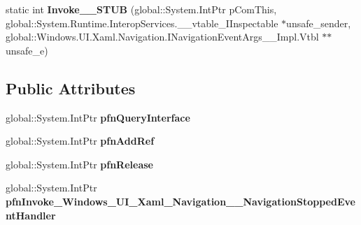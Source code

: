 \begin{DoxyCompactItemize}
\item 
\mbox{\label{struct_windows_1_1_u_i_1_1_xaml_1_1_navigation_1_1_navigation_stopped_event_handler_____impl_1_1_vtbl_aae8bd7c57fa7d06fce78441e6b852c80}} 
static int {\bfseries Invoke\+\_\+\+\_\+\+S\+T\+UB} (global\+::\+System.\+Int\+Ptr p\+Com\+This, global\+::\+System.\+Runtime.\+Interop\+Services.\+\_\+\+\_\+vtable\+\_\+\+I\+Inspectable $\ast$unsafe\+\_\+sender, global\+::\+Windows.\+U\+I.\+Xaml.\+Navigation.\+I\+Navigation\+Event\+Args\+\_\+\+\_\+\+Impl.\+Vtbl $\ast$$\ast$unsafe\+\_\+e)
\end{DoxyCompactItemize}
\subsection*{Public Attributes}
\begin{DoxyCompactItemize}
\item 
\mbox{\label{struct_windows_1_1_u_i_1_1_xaml_1_1_navigation_1_1_navigation_stopped_event_handler_____impl_1_1_vtbl_aef2de3a42e8325c6ee9c0f8f1fb0f4a3}} 
global\+::\+System.\+Int\+Ptr {\bfseries pfn\+Query\+Interface}
\item 
\mbox{\label{struct_windows_1_1_u_i_1_1_xaml_1_1_navigation_1_1_navigation_stopped_event_handler_____impl_1_1_vtbl_a6385d7668abfeabd1cba44953afd55e6}} 
global\+::\+System.\+Int\+Ptr {\bfseries pfn\+Add\+Ref}
\item 
\mbox{\label{struct_windows_1_1_u_i_1_1_xaml_1_1_navigation_1_1_navigation_stopped_event_handler_____impl_1_1_vtbl_aea7170ae54b10655ce3f5c5dc709b416}} 
global\+::\+System.\+Int\+Ptr {\bfseries pfn\+Release}
\item 
\mbox{\label{struct_windows_1_1_u_i_1_1_xaml_1_1_navigation_1_1_navigation_stopped_event_handler_____impl_1_1_vtbl_ac00a60382158d6ea6d5b94bb4d170239}} 
global\+::\+System.\+Int\+Ptr {\bfseries pfn\+Invoke\+\_\+\+Windows\+\_\+\+U\+I\+\_\+\+Xaml\+\_\+\+Navigation\+\_\+\+\_\+\+Navigation\+Stopped\+Event\+Handler}
\end{DoxyCompactItemize}
